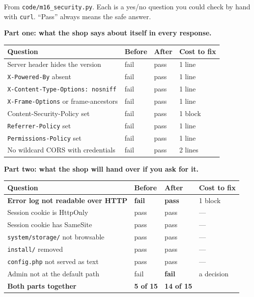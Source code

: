 \begin{measured}
From \texttt{code/m16\_security.py}. Each is a yes/no question you could check
by hand with \texttt{curl}. ``Pass'' always means the safe answer.

\textbf{Part one: what the shop says about itself in every response.}

\begin{longtable}{@{}L{7.4cm}L{1.9cm}L{1.9cm}L{2.4cm}@{}}
\toprule
{}
\textbf{Question} & \textbf{Before} & \textbf{After} & \textbf{Cost to fix} \\
\midrule
\endhead
Server header hides the version & fail & pass & 1 line \\
\texttt{X-Powered-By} absent & fail & pass & 1 line \\
\texttt{X-Content-Type-Options: nosniff} & fail & pass & 1 line \\
\texttt{X-Frame-Options} or frame-ancestors & fail & pass & 1 line \\
Content-Security-Policy set & fail & pass & 1 block \\
\texttt{Referrer-Policy} set & fail & pass & 1 line \\
\texttt{Permissions-Policy} set & fail & pass & 1 line \\
No wildcard CORS with credentials & fail & pass & 2 lines \\
\bottomrule
\end{longtable}

\smallskip
\textbf{Part two: what the shop will hand over if you ask for it.}

\begin{longtable}{@{}L{7.4cm}L{1.9cm}L{1.9cm}L{2.4cm}@{}}
\toprule
{}
\textbf{Question} & \textbf{Before} & \textbf{After} & \textbf{Cost to fix} \\
\midrule
\endhead
\textbf{Error log not readable over HTTP} & \textbf{fail} & \textbf{pass} &
1 block \\
Session cookie is HttpOnly & pass & pass & --- \\
Session cookie has SameSite & pass & pass & --- \\
\texttt{system/storage/} not browsable & pass & pass & --- \\
\texttt{install/} removed & pass & pass & --- \\
\texttt{config.php} not served as text & pass & pass & --- \\
Admin not at the default path & fail & \textbf{fail} & a decision \\
\midrule
\textbf{Both parts together} & \textbf{5 of 15} & \textbf{14 of 15} & \\
\bottomrule
\end{longtable}


\end{measured}
